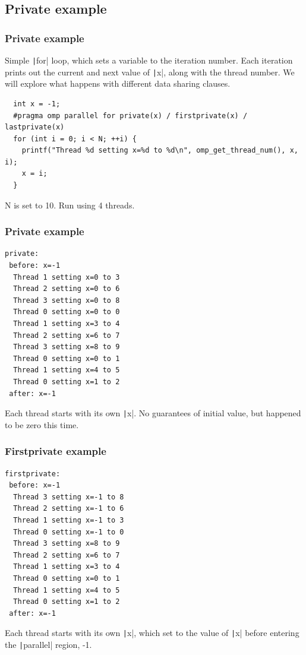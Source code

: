 \documentclass[aspectratio=169]{beamer}
\begin{document}
\subsection{Private example}
\begin{frame}[fragile]
\frametitle{Private example}
Simple \texttt|for| loop, which sets a variable to the iteration number.
Each iteration prints out the current and next value of \texttt|x|, along with the thread number.
We will explore what happens with different data sharing clauses.

\begin{verbatim}
  int x = -1;
  #pragma omp parallel for private(x) / firstprivate(x) / lastprivate(x)
  for (int i = 0; i < N; ++i) {
    printf("Thread %d setting x=%d to %d\n", omp_get_thread_num(), x, i);
    x = i;
  }
\end{verbatim}
N is set to 10.
Run using 4 threads.
\end{frame}

\begin{frame}[fragile]
\frametitle{Private example}
\begin{verbatim}
private:
 before: x=-1
  Thread 1 setting x=0 to 3
  Thread 2 setting x=0 to 6
  Thread 3 setting x=0 to 8
  Thread 0 setting x=0 to 0
  Thread 1 setting x=3 to 4
  Thread 2 setting x=6 to 7
  Thread 3 setting x=8 to 9
  Thread 0 setting x=0 to 1
  Thread 1 setting x=4 to 5
  Thread 0 setting x=1 to 2
 after: x=-1
\end{verbatim}
Each thread starts with its own \texttt|x|.
No guarantees of initial value, but happened to be zero this time.
\end{frame}

\begin{frame}[fragile]
\frametitle{Firstprivate example}
\begin{verbatim}
firstprivate:
 before: x=-1
  Thread 3 setting x=-1 to 8
  Thread 2 setting x=-1 to 6
  Thread 1 setting x=-1 to 3
  Thread 0 setting x=-1 to 0
  Thread 3 setting x=8 to 9
  Thread 2 setting x=6 to 7
  Thread 1 setting x=3 to 4
  Thread 0 setting x=0 to 1
  Thread 1 setting x=4 to 5
  Thread 0 setting x=1 to 2
 after: x=-1
\end{verbatim}
Each thread starts with its own \texttt|x|, which set to the value of \texttt|x| before entering the \texttt|parallel| region, -1.
\end{frame}
\end{document}
